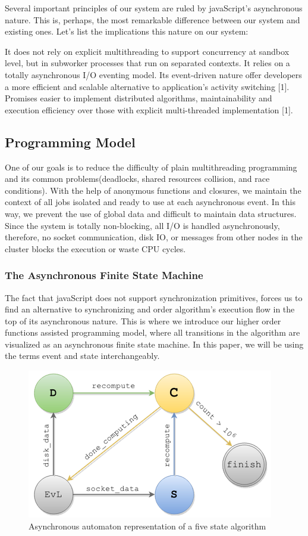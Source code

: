 \documentclass[10pt,reprint]{socc14}
\begin{document}
Several important principles of our system are ruled by javaScript’s asynchronous nature. This is, perhaps, the most remarkable difference between our system and existing ones. Let's list the implications this nature on our system:

It does not rely on explicit multithreading to support concurrency at sandbox level, but in subworker processes that run on separated contexts.
It relies on a totally asynchronous I/O eventing model.
Its event-driven nature offer developers a more efficient and scalable alternative to application’s activity switching [1].
Promises easier to implement distributed algorithms, maintainability and execution efficiency over those with explicit multi-threaded implementation [1]. 

\subsection{Programming Model}
One of our goals is to reduce the difficulty of plain multithreading programming and its common problems(deadlocks, shared resources collision, and race conditions). With the help of anonymous functions and closures, we maintain the context of all jobs isolated and ready to use at each asynchronous event. In this way, we prevent the use of global data and difficult to maintain data structures. Since the system is totally non-blocking, all I/O is handled asynchronously, therefore, no socket communication, disk IO, or messages from other nodes in the cluster blocks the execution or waste CPU cycles.

\subsubsection{The Asynchronous Finite State Machine}
The fact that javaScript does not support synchronization primitives, forces us to find an alternative to synchronizing and order algorithm’s execution flow in the top of its asynchronous nature. This is where we introduce our higher order functions assisted programming model, where all transitions in the algorithm are visualized as an asynchronous finite state machine. In this paper, we will be using the terms event and state interchangeably.

\begin{figure}[h]	
	\centering
	\includegraphics[scale=0.6]{AsynchronousAutomaton}
	\caption{Asynchronous automaton representation of a five state algorithm}
\end{figure}
\end{document}

